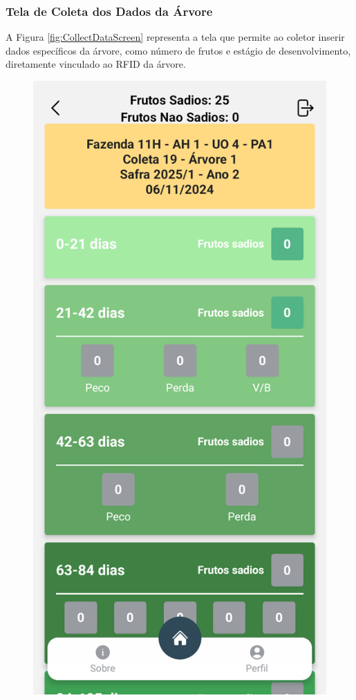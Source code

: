 \subsubsection{Tela de Coleta dos Dados da Árvore}
A Figura \ref{fig:CollectDataScreen} representa a tela que permite ao coletor inserir dados específicos da árvore, como número de frutos e estágio de desenvolvimento, diretamente vinculado ao RFID da árvore.

\begin{figure}[H]
    \centering
    \begin{minipage}[b]{0.30\textwidth}
        \centering
        \includegraphics[width=\textwidth]{images/app/10-collect.png}

\end{minipage}
\end{figure}
